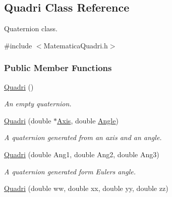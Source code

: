 \hypertarget{classQuadri}{}\subsection{Quadri Class Reference}
\label{classQuadri}


Quaternion class.  




{\ttfamily \#include $<$Matematica\+Quadri.\+h$>$}

\subsubsection*{Public Member Functions}
\begin{DoxyCompactItemize}
\item 
\hyperlink{classQuadri_a1051e0443d05a67496c2d8a5a8744712}{Quadri} ()\hypertarget{classQuadri_a1051e0443d05a67496c2d8a5a8744712}{}\label{classQuadri_a1051e0443d05a67496c2d8a5a8744712}

\begin{DoxyCompactList}\small\item\em An empty quaternion. \end{DoxyCompactList}\item 
\hyperlink{classQuadri_a5ea507ca84d37e0d674d19fc969ffaf2}{Quadri} (double $\ast$\hyperlink{classQuadri_ae46739cce135a25e59e90f29fa990d7a}{Axis}, double \hyperlink{classQuadri_a5873189e35681f049ce11fe5e220661d}{Angle})\hypertarget{classQuadri_a5ea507ca84d37e0d674d19fc969ffaf2}{}\label{classQuadri_a5ea507ca84d37e0d674d19fc969ffaf2}

\begin{DoxyCompactList}\small\item\em A quaternion generated from an axis and an angle. \end{DoxyCompactList}\item 
\hyperlink{classQuadri_aa8242ff0da98f01f31c7a3afd7e5deb2}{Quadri} (double Ang1, double Ang2, double Ang3)\hypertarget{classQuadri_aa8242ff0da98f01f31c7a3afd7e5deb2}{}\label{classQuadri_aa8242ff0da98f01f31c7a3afd7e5deb2}

\begin{DoxyCompactList}\small\item\em A quaternion generated form Euler\textquotesingle{}s angle. \end{DoxyCompactList}\item 
\hyperlink{classQuadri_a99dde187c9bd1e5983cf797d5cf55d4b}{Quadri} (double ww, double xx, double yy, double zz)\hypertarget{classQuadri_a99dde187c9bd1e5983cf797d5cf55d4b}{}\label{classQuadri_a99dde187c9bd1e5983cf797d5cf55d4b}


\end{DoxyCompactItemize}
